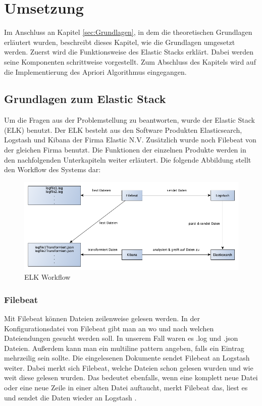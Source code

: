 \section{Umsetzung}
\label{sec:Umsetzung}
Im Anschluss an Kapitel \ref{sec:Grundlagen}, in dem die theoretischen Grundlagen erläutert wurden, beschreibt dieses Kapitel, wie die Grundlagen umgesetzt werden. Zuerst wird die Funktionsweise des Elastic Stacks erklärt. Dabei werden seine Komponenten schrittweise vorgestellt. Zum Abschluss des Kapitels wird auf die Implementierung des Apriori Algorithmus eingegangen.

\subsection{Grundlagen zum Elastic Stack}
\label{sub:Grundlagen zum Elastic Stack}
Um die Fragen aus der Problemstellung zu beantworten, wurde der Elastic Stack (ELK) benutzt. Der ELK besteht aus den Software Produkten Elasticsearch, Logstash und Kibana der Firma Elastic N.V. Zusätzlich wurde noch Filebeat von der gleichen Firma benutzt. Die Funktionen der einzelnen Produkte werden in den nachfolgenden Unterkapiteln weiter erläutert. Die folgende Abbildung stellt den Workflow des Systems dar:

\begin{figure}[htb]
\begin{center}
	\includegraphics[width=440pt]{bilder/workflow.png}
\end{center}
\caption{ELK Workflow}
\label{fig:elk_workflow}
\end{figure}


\subsubsection{Filebeat}
\label{ssub:Filebeat}
Mit Filebeat können Dateien zeilenweise gelesen werden. In der Konfigurationsdatei von Filebeat gibt man an wo und nach welchen Dateiendungen gesucht werden soll. In unserem Fall waren es .log und .json Dateien. Außerdem kann man ein multiline pattern angeben, falls ein Eintrag mehrzeilig sein sollte. Die eingelesenen Dokumente sendet Filebeat an Logstash weiter. Dabei merkt sich Filebeat, welche Dateien schon gelesen wurden und wie weit diese gelesen wurden. Das bedeutet ebenfalls, wenn eine komplett neue Datei oder eine neue Zeile in einer alten Datei auftaucht, merkt Filebeat das, liest es und sendet die Daten wieder an Logstash \citep{ShuSha17}.
